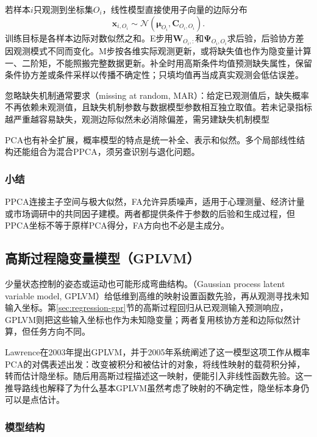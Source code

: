 若样本$i$只观测到坐标集$O_i$，线性模型直接使用子向量的边际分布
\begin{equation}
\label{eq:dim-linear-missing}
\bm{x}_{i,O_i}\sim
\mathcal{N}(\bm{\mu}_{O_i},\bm{C}_{O_i,O_i}).
\end{equation}
训练目标是各样本边际对数似然之和。E步用$\bm{W}_{O_i,:}$和$\bm{\Psi}_{O_i,O_i}$求后验，后验协方差因观测模式不同而变化。M步按各维实际观测更新，或将缺失值也作为隐变量计算一、二阶矩，不能照搬完整数据更新。补全时用高斯条件均值预测缺失属性，保留条件协方差或条件采样以传播不确定性；只填均值再当成真实观测会低估误差。

忽略缺失机制通常要求（missing at random, MAR）：给定已观测值后，缺失概率不再依赖未观测值，且缺失机制参数与数据模型参数相互独立取值。若未记录指标越严重越容易缺失，观测边际似然未必消除偏差，需另建缺失机制模型

PCA也有补全扩展，概率模型的特点是统一补全、表示和似然。多个局部线性结构还能组合为混合PPCA，须另查识别与退化问题。

\subsubsection{小结}
\label{sec:dim-ppca-summary}

PPCA连接主子空间与极大似然，FA允许异质噪声，适用于心理测量、经济计量或市场调研中的共同因子建模。两者都提供条件于参数的后验和生成过程，但PPCA坐标不等于原样PCA得分，FA方向也不必是主成分。

\subsection{高斯过程隐变量模型（GPLVM）}
\label{sec:dim-gplvm}

少量状态控制的姿态或运动也可能形成弯曲结构。（Gaussian process latent variable model, GPLVM）给低维到高维的映射设置函数先验，再从观测寻找未知输入坐标。第\ref{sec:regression-gpr}节的高斯过程回归从已观测输入预测响应，GPLVM则把这些输入坐标也作为未知隐变量；两者复用核协方差和边际似然计算，但任务方向不同。

Lawrence在2003年提出GPLVM，并于2005年系统阐述了这一模型这项工作从概率PCA的对偶表述出发：改变被积分和被估计的对象，将线性映射的载荷积分掉，转而估计隐坐标。随后用高斯过程描述这一映射，便能引入非线性函数先验。这一推导路线也解释了为什么基本GPLVM虽然考虑了映射的不确定性，隐坐标本身仍可以是点估计。

\subsubsection{模型结构}
\label{sec:dim-gplvm-structure}

